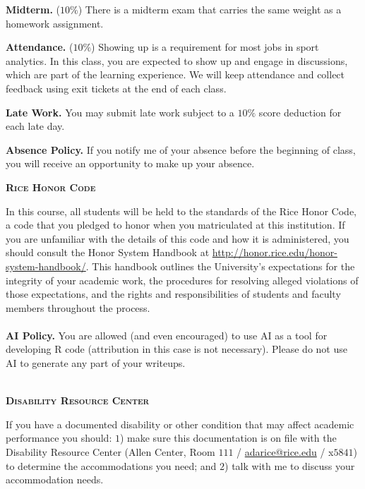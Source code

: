 \documentclass[11pt]{article}
\begin{document}
\begin{adjustwidth}{1cm}{0cm}
  \textbf{Midterm.} ($10\%$) There is a midterm exam that carries the same weight as a homework assignment.

  \textbf{Attendance.} ($10\%$) Showing up is a requirement for most jobs in sport analytics. In this class, you are expected to show up and engage in discussions, which are part of the learning experience. We will keep attendance and collect feedback using exit tickets at the end of each class.

  \textbf{Late Work.} You may submit late work subject to a $10\%$ score deduction for each late day.

  \textbf{Absence Policy.} If you notify me of your absence before the beginning of class, you will receive an opportunity to make up your absence.
\end{adjustwidth}

\newpage
\textbf{\textsc{Rice Honor Code}}
\begin{adjustwidth}{1cm}{0cm}
  In this course, all students will be held to the standards of the Rice Honor Code, a code that you pledged to honor when you matriculated at this institution. If you are unfamiliar with the details of this code and how it is administered, you should consult the Honor System Handbook at \url{http://honor.rice.edu/honor-system-handbook/}. This handbook outlines the University's expectations for the integrity of your academic work, the procedures for resolving alleged violations of those expectations, and the rights and responsibilities of students and faculty members throughout the process.\\
  ~\\
  \textbf{AI Policy.} You are allowed (and even encouraged) to use AI as a tool for developing R code (attribution in this case is not necessary). Please do not use AI to generate any part of your writeups.
\end{adjustwidth}

~\\
\textbf{\textsc{Disability Resource Center}}
\begin{adjustwidth}{1cm}{0cm}
  If you have a documented disability or other condition that may affect academic performance you should: $1$) make sure this documentation is on file with the Disability Resource Center (Allen Center, Room $111$ / \href{mailto:adarice@rice.edu}{adarice@rice.edu} / x$5841$) to determine the accommodations you need; and $2$) talk with me to discuss your accommodation needs.
\end{adjustwidth}
\end{document}
